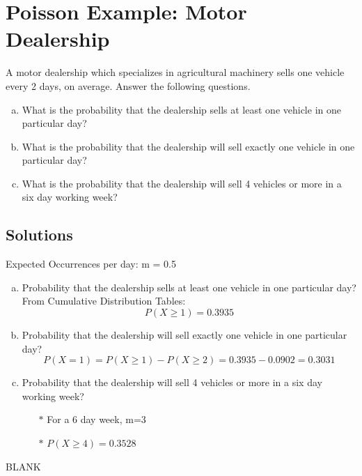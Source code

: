 \documentclass[a4paper,12pt]{article}
\begin{document}
\large 


\section*{Poisson Example: Motor Dealership}
A motor dealership which specializes in agricultural machinery sells one vehicle every 2 days, on average. Answer the following questions.
\begin{enumerate}[(a)]
	\item   What is the probability that the dealership sells at least one vehicle in one particular day?
	\item   What is the probability that the dealership will sell exactly one vehicle in one particular day?
	\item   What is the probability that the dealership will sell 4 vehicles or more in a six day working week?
\end{enumerate}

\subsection*{Solutions}

\noindent Expected Occurrences per day: m = 0.5

\begin{enumerate}[(a)]
	\item  Probability that the dealership sells at least one vehicle in one particular day?\\
	
	\smallskip
	From Cumulative Distribution Tables:
	\[ P(X \geq 1) = 0.3935 \]
	\item  Probability that the dealership will sell exactly one vehicle in one particular day?
	\[ P(X = 1) = P(X \geq 1) - P(X \geq 2)  = 0.3935 - 0.0902 = 0.3031\]
	\item  Probability that the dealership will sell 4 vehicles or more in a six day working week?
	\begin{itemize}
		\item [$\ast$] For a 6 day week, m=3
		\item [$\ast$] $P(X \geq 4) = 0.3528$
	\end{itemize}
\end{enumerate}

\newpage 
BLANK
\end{document}
